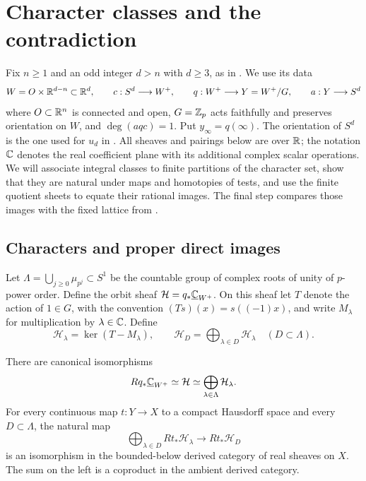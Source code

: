 \section{Character classes and the contradiction}\label{sec:characters}

Fix $n\geq1$ and an odd integer $d>n$ with $d\geq3$, as in
.  We use its data
\[
 W=O\times\mathbb R^{d-n}\subset\mathbb R^d,\qquad
 c:S^d\longrightarrow W^+,
 \qquad q:W^+\longrightarrow Y=W^+/G,
 \qquad a:Y\longrightarrow S^d
\]
where $O\subset\mathbb R^n$ is connected and open, $G=\mathbb Z_p$ acts faithfully
and preserves orientation on $W$, and $\deg(aqc)=1$.
Put $y_\infty=q(\infty)$.  The orientation of $S^d$ is the one used
for $u_d$ in .
All sheaves and pairings below are over $\mathbb R$; the notation $\mathbb C$ denotes
the real coefficient plane with its additional complex scalar operations.
We will associate integral classes to finite partitions of the character
set, show that they are natural under maps and homotopies of tests, and
use the finite quotient sheets to equate their rational images. The final
step compares those images with the fixed lattice from
.

\subsection{Characters and proper direct images}

Let $\Lambda=\bigcup_{j\geq 0}\mu_{p^j}\subset S^1$ be the countable
group of complex roots of unity of $p$-power order. Define the orbit sheaf
$\mathcal H=q_*\underline{\mathbb C}_{W^+}$. On this sheaf let $T$ denote the
action of $1\in G$, with the convention
$(Ts)(x)=s((-1)x)$, and write $M_\lambda$ for multiplication by
$\lambda\in\mathbb C$.  Define
\[
 \mathcal H_\lambda=\ker(T-M_\lambda),\qquad
 \mathcal H_D=\bigoplus_{\lambda\in D}\mathcal H_\lambda
 \quad(D\subset\Lambda).
\]

\begin{lemma}\label{lem:character-coproduct}
There are canonical isomorphisms
\begin{equation}\label{char:orbit-sum}
 Rq_*\underline{\mathbb C}_{W^+}\simeq\mathcal H
       \simeq\bigoplus_{\lambda\in\Lambda}\mathcal H_\lambda.
\end{equation}
For every continuous map $t:Y\to X$ to a compact Hausdorff space and
every $D\subset\Lambda$, the natural map
\begin{equation}\label{char:derived-sum}
 \bigoplus_{\lambda\in D}Rt_*\mathcal H_\lambda
       \longrightarrow Rt_*\mathcal H_D
\end{equation}
is an isomorphism in the bounded-below derived category of real sheaves
on $X$.  The sum on the left is a coproduct in the ambient derived
category.
\end{lemma}

